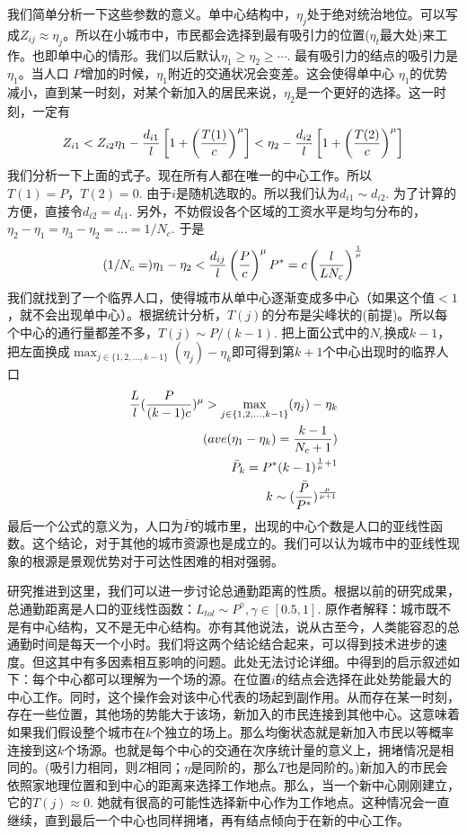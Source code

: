 我们简单分析一下这些参数的意义。单中心结构中，$\eta_j$处于绝对统治地位。可以写成$Z_{ij}\approx \eta_j$。所以在小城市中，市民都会选择到最有吸引力的位置($\eta_t$最大处)来工作。也即单中心的情形。我们以后默认$\eta_1\ge \eta_2\geq\cdots.$ 最有吸引力的结点的吸引力是 $\eta_1$。当人口 $P$增加的时候，$\eta_1$附近的交通状况会变差。这会使得单中心 $\eta_1$的优势减小，直到某一时刻，对某个新加入的居民来说，$\eta_2$是一个更好的选择。这一时刻，一定有
\[Z_{i1}<Z_{i2}\notag\\
\eta_1-\frac{d_{i1}}{l}\left[ 1+\left( \frac{T(1)}{c} \right)^\mu \right]<\eta_2-\frac{d_{i2}}{l}\left[ 1+\left( \frac{T(2)}{c} \right)^\mu \right] \]我们分析一下上面的式子。现在所有人都在唯一的中心工作。所以$T(1) = P，T(2)= 0.$ 由于$i$是随机选取的。所以我们认为$d_{i1}\sim d_{i2}$. 为了计算的方便，直接令$d_{i2} = d_{i1}$. 另外，不妨假设各个区域的工资水平是均匀分布的，$\eta_2-\eta_1 = \eta_3-\eta_2=\ldots=1/N_c$. 于是
\[(1/N_c =)\eta_1-\eta_2<\frac{d_{ij}}{l} \left(\frac{P}{c}\right)^\mu\notag\\
P^* =c\left( \frac{l}{LN_c}    \right)^\frac{1}{\mu}\]我们就找到了一个临界人口，使得城市从单中心逐渐变成多中心（如果这个值$<1$，就不会出现单中心）。根据统计分析，$T(j)$的分布是尖峰状的(前提)。所以每个中心的通行量都差不多，$T(j)\sim P/(k-1)$. 把上面公式中的$N_c$换成$k-1$，把左面换成$\max_{j\in\{1,2,\ldots,k-1\}}(\eta_j)-\eta_k$即可得到第$k+1$个中心出现时的临界人口
\begin{align}
  \frac{L}{l}(\frac{P}{(k-1)c})^\mu>\max_{j\in\{1,2,\ldots,k-1\}}(\eta_j)-\eta_k\notag\\
(ave({\eta_1-\eta_k})=\frac{k-1}{N_c+1})\notag\\
\bar P_k = P^{*}(k-1)^{\frac{1}{\mu}+1}\notag\\
k\sim(\frac{\bar P}{P^{*}})^\frac{\mu}{\mu+1}
\end{align}
最后一个公式的意义为，人口为$\bar{P}$的城市里，出现的中心个数是人口的亚线性函数。这个结论，对于其他的城市资源也是成立的。我们可以认为城市中的亚线性现象的根源是景观优势对于可达性困难的相对强弱。

研究推进到这里，我们可以进一步讨论总通勤距离的性质。根据以前的研究成果，总通勤距离是人口的亚线性函数：$L_{tol}\sim P^\gamma,\gamma\in [0.5,1].$ 原作者解释：城市既不是有中心结构，又不是无中心结构。亦有其他说法，说从古至今，人类能容忍的总通勤时间是每天一个小时。我们将这两个结论结合起来，可以得到技术进步的速度。但这其中有多因素相互影响的问题。此处无法讨论详细。\cite{Louf2013}中得到的启示叙述如下：每个中心都可以理解为一个场的源。在位置$i$的结点会选择在此处势能最大的中心工作。同时，这个操作会对该中心代表的场起到副作用。从而存在某一时刻，存在一些位置，其他场的势能大于该场，新加入的市民连接到其他中心。这意味着如果我们假设整个城市在$k$个独立的场上。那么均衡状态就是新加入市民以等概率连接到这$k$个场源。也就是每个中心的交通在次序统计量的意义上，拥堵情况是相同的。(吸引力相同，则$Z$相同；$\eta$是同阶的，那么$T$也是同阶的。)新加入的市民会依照家地理位置和到中心的距离来选择工作地点。那么，当一个新中心刚刚建立，它的$T(j)\approx 0.$ 她就有很高的可能性选择新中心作为工作地点。这种情况会一直继续，直到最后一个中心也同样拥堵，再有结点倾向于在新的中心工作。

